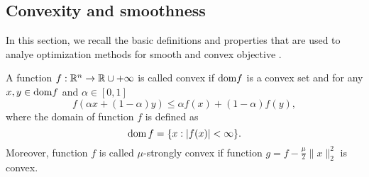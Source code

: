 \subsection{Convexity and smoothness}\label{sec:basics_conv_and_smoothness}
In this section, we recall the basic definitions and properties that are used to analye optimization methods for smooth and convex objective \cite{hiriart2012fundamentals}. 
\begin{definition}
A function $f:\mathbb{R}^n\rightarrow \mathbb{R}\cup{+\infty}$ is called convex if $\mathrm{dom} f$ is a convex set and for any $x, y\in \mathrm{dom} f$ and $\alpha \in[0,1]$
\begin{equation}\label{eq:conv_def}
f(\alpha x + (1-\alpha)y)\leq \alpha f(x) + (1-\alpha)f(y),
\end{equation}
where the domain of function $f$ is defined as
$$
\mathrm{dom}\,f = \{x:|f(x)|<\infty\}.
$$
Moreover, function $f$ is called $\mu$-strongly convex if function $g = f - \frac{\mu}{2}\|x\|_2^2$ is convex.
\end{definition}



